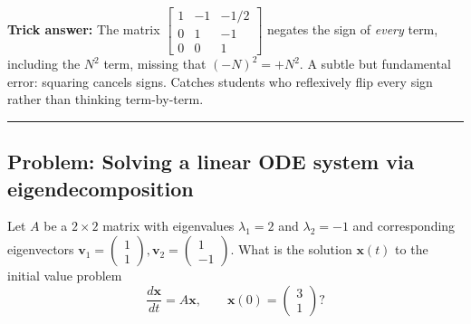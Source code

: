 \documentclass[12pt]{amsart}
\newcommand{\divider}{
  \vspace{-1em}
  \noindent
  \raisebox{-0.15ex}{\textbullet}%
  \hspace{0.5em}%
  \rule[0.5ex]{0.95\textwidth}{1.0pt}%
  \hspace{0.5em}%
  \raisebox{-0.15ex}{\textbullet}%
  \vspace{0em}
}
\begin{document}
\textbf{Trick answer:}
The matrix $\begin{bmatrix} 1 & -1 & -1/2 \\ 0 & 1 & -1 \\ 0 & 0 & 1 \end{bmatrix}$
negates the sign of \emph{every} term, including the $N^2$ term, missing
that $(-N)^2 = +N^2$. A subtle but fundamental error: squaring cancels
signs. Catches students who reflexively flip every sign rather than
thinking term-by-term.

\divider

\subsection*{Problem: Solving a linear ODE system via eigendecomposition}

Let $A$ be a $2 \times 2$ matrix with eigenvalues $\lambda_1 = 2$ and
$\lambda_2 = -1$ and corresponding eigenvectors
$\mathbf{v}_1 = \begin{pmatrix} 1 \\ 1 \end{pmatrix}, \mathbf{v}_2 = \begin{pmatrix} 1 \\ -1 \end{pmatrix}$.
What is the solution $\mathbf{x}(t)$ to the initial value problem
\[
\frac{d\mathbf{x}}{dt} = A\mathbf{x}, \qquad \mathbf{x}(0) = \begin{pmatrix} 3 \\ 1 \end{pmatrix}?
\]
\end{document}
